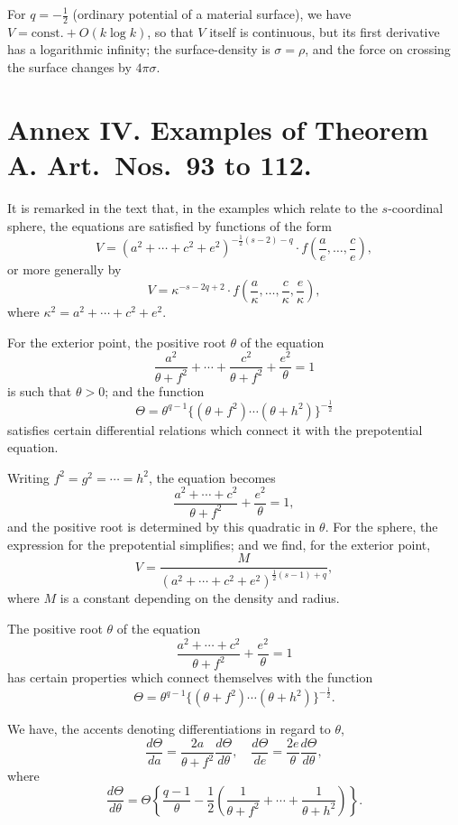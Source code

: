 \documentclass[11pt,a4paper]{book}
\begin{document}
\begin{art}\label{art:80}
For $q = -\tfrac{1}{2}$ (ordinary potential of a material surface), we have $V = \text{const.} + O(k\log k)$, so that $V$ itself is continuous, but its first derivative has a logarithmic infinity; the surface-density is $\sigma = \rho$, and the force on crossing the surface changes by $4\pi\sigma$.
\end{art}

\newpage
\section*{Annex IV. Examples of Theorem A. Art.\ Nos.\ 93 to 112.}

\begin{art}\label{art:93}
It is remarked in the text that, in the examples which relate to the $s$-coordinal sphere, the equations are satisfied by functions of the form
\[
V = (a^2 + \cdots + c^2 + e^2)^{-\frac{1}{2}(s-2)-q} \cdot f\left(\frac{a}{e}, \ldots, \frac{c}{e}\right),
\]
or more generally by
\[
V = \kappa^{-s-2q+2} \cdot f\left(\frac{a}{\kappa}, \ldots, \frac{c}{\kappa}, \frac{e}{\kappa}\right),
\]
where $\kappa^2 = a^2 + \cdots + c^2 + e^2$.
\end{art}

\begin{art}\label{art:94}
For the exterior point, the positive root $\theta$ of the equation
\[
\frac{a^2}{\theta + f^2} + \cdots + \frac{c^2}{\theta + f^2} + \frac{e^2}{\theta} = 1
\]
is such that $\theta > 0$; and the function
\[
\Theta = \theta^{q-1} \{(\theta + f^2) \cdots (\theta + h^2)\}^{-\frac{1}{2}}
\]
satisfies certain differential relations which connect it with the prepotential equation.
\end{art}

\begin{art}\label{art:95}
Writing $f^2 = g^2 = \cdots = h^2$, the equation becomes
\[
\frac{a^2 + \cdots + c^2}{\theta + f^2} + \frac{e^2}{\theta} = 1,
\]
and the positive root is determined by this quadratic in $\theta$. For the sphere, the expression for the prepotential simplifies; and we find, for the exterior point,
\[
V = \frac{M}{(a^2 + \cdots + c^2 + e^2)^{\frac{1}{2}(s-1)+q}},
\]
where $M$ is a constant depending on the density and radius.
\end{art}

\begin{art}\label{art:96}
The positive root $\theta$ of the equation
\[
\frac{a^2 + \cdots + c^2}{\theta + f^2} + \frac{e^2}{\theta} = 1
\]
has certain properties which connect themselves with the function
\[
\Theta = \theta^{q-1} \{(\theta + f^2) \cdots (\theta + h^2)\}^{-\frac{1}{2}}.
\]

We have, the accents denoting differentiations in regard to $\theta$,
\[
\frac{d\Theta}{da} = \frac{2a}{\theta + f^2} \frac{d\Theta}{d\theta}, \quad \frac{d\Theta}{de} = \frac{2e}{\theta} \frac{d\Theta}{d\theta},
\]
where
\[
\frac{d\Theta}{d\theta} = \Theta \left\{\frac{q-1}{\theta} - \frac{1}{2}\left(\frac{1}{\theta + f^2} + \cdots + \frac{1}{\theta + h^2}\right)\right\}.
\]
\end{art}
\end{document}
